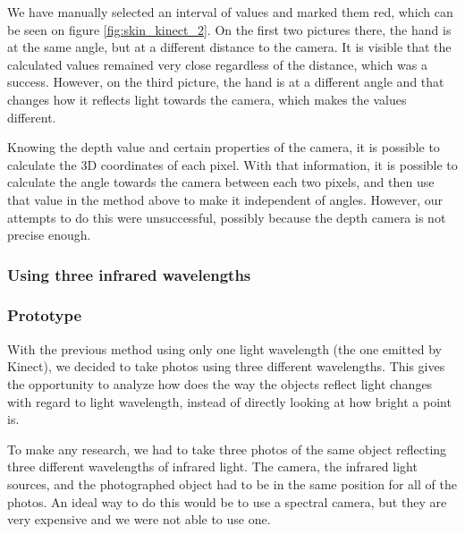             We have manually selected an interval of values and marked them red, which
            can be seen on figure \ref{fig:skin_kinect_2}.
            On the first two pictures there, the hand is at the same angle, but at a
            different distance to the camera.
            It is visible that the calculated values remained very close regardless
            of the distance, which was a success.
            However, on the third picture, the hand is at a different angle and
            that changes how it reflects light towards the camera, which makes the values
            different.

            Knowing the depth value and certain properties of the camera, it is possible
            to calculate the 3D coordinates of each pixel.
            With that information, it is possible to calculate the angle towards the
            camera between each two pixels, and then use that value in the method above
            to make it independent of angles.
            However, our attempts to do this were unsuccessful, possibly because the
            depth camera is not precise enough.

        \subsubsection{Using three infrared wavelengths}
            \subsubsection*{Prototype}
            With the previous method using only one light wavelength (the one emitted by
            Kinect), we decided to take photos using three different wavelengths.
            This gives the opportunity to analyze how does the way the objects reflect
            light changes with regard to light wavelength, instead of directly looking
            at how bright a point is.

            To make any research, we had to take three photos of the same object
            reflecting three different wavelengths of infrared light.
            The camera, the infrared light sources, and the photographed object
            had to be in the same position for all of the photos.
            An ideal way to do this would be to use a spectral camera, but they are
            very expensive and we were not able to use one.

